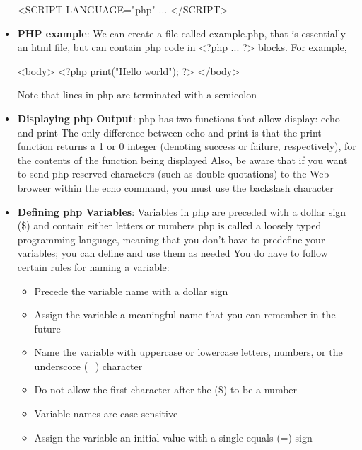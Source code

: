 \documentclass{report}
\begin{document}
\begin{itemize}
\begin{bashcode}
            <SCRIPT LANGUAGE="php"
                ...
            </SCRIPT>
            \end{bashcode}
        \item \textbf{PHP example}: We can create a file called example.php, that is essentially an html file, but can contain php code in <?php ... ?> blocks. For example,
            \bigbreak \noindent 
            \begin{bashcode}
            <body>
                <?php 
                    print("Hello world");
                ?>
            </body>
            \end{bashcode}
            \bigbreak \noindent 
            Note that lines in php are terminated with a semicolon
        \item \textbf{Displaying php Output}: php has two functions that allow display: echo and print
            \bigbreak \noindent 
            The only difference between echo and print is that the print function returns a 1 or 0 integer (denoting success or failure, respectively), for the contents of the function being displayed
            \bigbreak \noindent 
            Also, be aware that if you want to send php reserved characters (such as double quotations) to the Web browser within the echo command, you must use the backslash character
        \item \textbf{Defining php Variables}:  Variables in php are preceded with a dollar sign (\$) and contain either letters or numbers
            \bigbreak \noindent 
            php is called a loosely typed programming language, meaning that you don't have to predefine your variables; you can define and use them as needed
            \bigbreak \noindent 
            You do have to follow certain rules for naming a variable:
            \begin{itemize}
                \item Precede the variable name with a dollar sign
                \item Assign the variable a meaningful name that you can remember in the future
                \item Name the variable with uppercase or lowercase letters, numbers, or the underscore (\_) character
                \item Do not allow the first character after the (\$) to be a number
                \item Variable names are case sensitive
                \item Assign the variable an initial value with a single equals (=) sign

\end{itemize}
\end{itemize}
\end{document}
